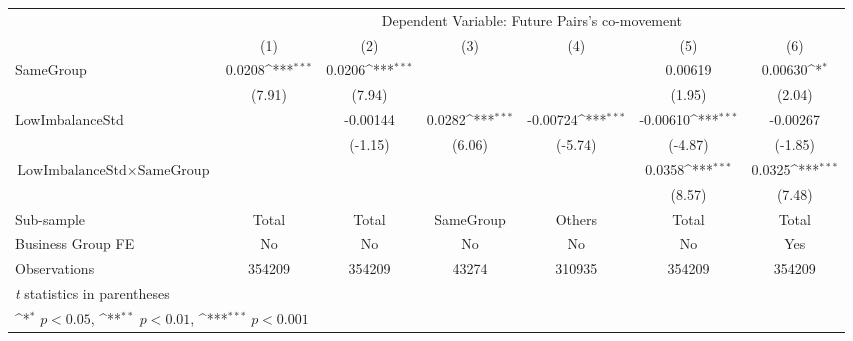 {
\def\sym#1{\ifmmode^{#1}\else\(^{#1}\)\fi}
\begin{tabular}{l*{6}{c}}
\hline\hline
                    &\multicolumn{6}{c}{Dependent Variable:  Future Pairs's co-movement}                                                                \\\cmidrule(lr){2-7}
                    &\multicolumn{1}{c}{(1)}         &\multicolumn{1}{c}{(2)}         &\multicolumn{1}{c}{(3)}         &\multicolumn{1}{c}{(4)}         &\multicolumn{1}{c}{(5)}         &\multicolumn{1}{c}{(6)}         \\
\hline
SameGroup           &      0.0208\sym{***}&      0.0206\sym{***}&                     &                     &     0.00619         &     0.00630\sym{*}  \\
                    &      (7.91)         &      (7.94)         &                     &                     &      (1.95)         &      (2.04)         \\
[1em]
LowImbalanceStd     &                     &    -0.00144         &      0.0282\sym{***}&    -0.00724\sym{***}&    -0.00610\sym{***}&    -0.00267         \\
                    &                     &     (-1.15)         &      (6.06)         &     (-5.74)         &     (-4.87)         &     (-1.85)         \\
[1em]
 $ \text{LowImbalanceStd} \times {\text{SameGroup} } $ &                     &                     &                     &                     &      0.0358\sym{***}&      0.0325\sym{***}\\
                    &                     &                     &                     &                     &      (8.57)         &      (7.48)         \\
\hline
Sub-sample          &       Total         &       Total         &   SameGroup         &      Others         &       Total         &       Total         \\
Business Group FE   &          No         &          No         &          No         &          No         &          No         &         Yes         \\
Observations        &      354209         &      354209         &       43274         &      310935         &      354209         &      354209         \\
\hline\hline
\multicolumn{7}{l}{\footnotesize \textit{t} statistics in parentheses}\\
\multicolumn{7}{l}{\footnotesize \sym{*} \(p<0.05\), \sym{**} \(p<0.01\), \sym{***} \(p<0.001\)}\\
\end{tabular}
}
